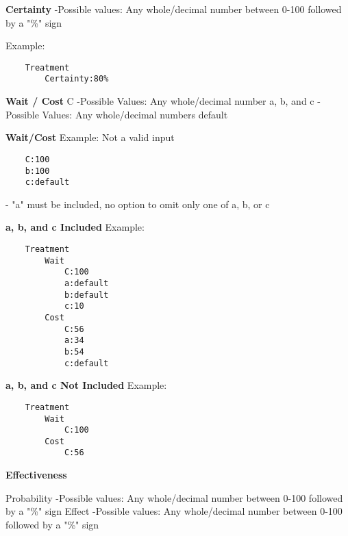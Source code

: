 \documentclass{article}
\begin{document}
\noindent \textbf{Certainty} \newline
\indent-Possible values:\newline
\indent\indent Any whole/decimal number between 0-100 followed by a "\%" sign \newline

\noindent Example: 
\begin{lstlisting}
    Treatment
        Certainty:80%
\end{lstlisting}


\noindent \textbf{Wait / Cost} \newline
\noindent C \newline
\indent -Possible Values:\newline
\indent\indent Any whole/decimal number\newline
\noindent a, b, and c\newline
\indent -Possible Values:\newline
\indent\indent Any whole/decimal numbers\newline
\indent\indent default\newline

\noindent \textbf{Wait/Cost} \newline
\noindent Example: Not a valid input
\begin{lstlisting}
    C:100
    b:100
    c:default
\end{lstlisting}
- "a" must be included, no option to omit only one of a, b, or c\newline


\noindent \textbf{a, b, and c Included} \newline
\noindent Example:
\begin{lstlisting}
    Treatment
        Wait
            C:100
            a:default
            b:default
            c:10
        Cost
            C:56
            a:34
            b:54
            c:default
 \end{lstlisting}   
 \noindent \textbf{a, b, and c Not Included} \newline
 \noindent Example:
 \begin{lstlisting}
    Treatment
        Wait
            C:100
        Cost
            C:56
 \end{lstlisting} 
 
\noindent \textbf{Effectiveness} 
    
\noindent Probability\newline
\indent-Possible values:\newline
\indent\indent Any whole/decimal number between 0-100 followed by a "\%" sign \newline
\noindent Effect\newline
\indent-Possible values:\newline
\indent\indent Any whole/decimal number between 0-100 followed by a "\%" sign \newline
    
\end{document}

